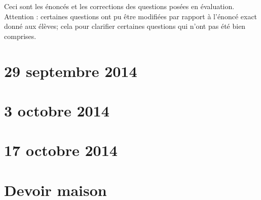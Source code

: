 

\begin{center}
    Ceci sont les énoncés et les corrections des questions posées en évaluation. Attention : certaines questions ont pu être modifiées par rapport à l'énoncé exact donné aux élèves; cela pour clarifier certaines questions qui n'ont pas été bien comprises.
\end{center}


\section{29 septembre 2014}


\section{3 octobre 2014}


\section{17 octobre 2014}


\section{Devoir maison}


